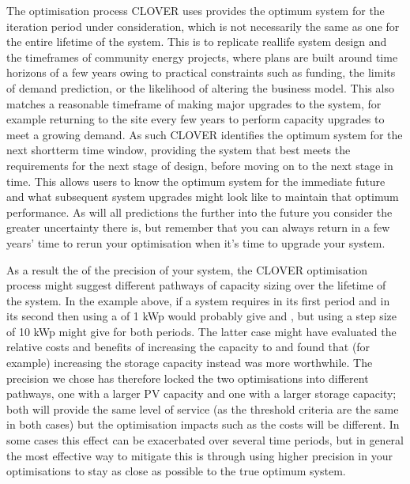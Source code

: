 \documentclass[letterpaper,10pt,english]{sphinxmanual}
\begin{document}
\sphinxAtStartPar
The optimisation process CLOVER uses provides the optimum system for the
iteration period under consideration, which is not necessarily the same
as one for the entire lifetime of the system. This is to replicate
real\sphinxhyphen{}life system design and the timeframes of community energy projects,
where plans are built around time horizons of a few years owing to
practical constraints such as funding, the limits of demand prediction,
or the likelihood of altering the business model. This also matches a
reasonable timeframe of making major upgrades to the system, for example
returning to the site every few years to perform capacity upgrades to
meet a growing demand. As such CLOVER identifies the optimum system for
the next short\sphinxhyphen{}term time window, providing the system that best meets
the requirements for the next stage of design, before moving on to the
next stage in time. This allows users to know the optimum system for the
immediate future and what subsequent system upgrades might look like to
maintain that optimum performance. As will all predictions the further
into the future you consider the greater uncertainty there is, but
remember that you can always return in a few years’ time to re\sphinxhyphen{}run your
optimisation when it’s time to upgrade your system.

\sphinxAtStartPar
As a result the of the precision of your system, the CLOVER optimisation
process might suggest different pathways of capacity sizing over the
lifetime of the system. In the example above, if a system requires
 in its first period and  in its
second then using a  of 1 kWp would probably give
 and , but using a step size of 10 kWp
might give  for both periods. The latter case might have
evaluated the relative costs and benefits of increasing the capacity to
 and found that (for example) increasing the storage
capacity instead was more worthwhile. The precision we chose has
therefore locked the two optimisations into different pathways, one with
a larger PV capacity and one with a larger storage capacity; both will
provide the same level of service (as the threshold criteria are the
same in both cases) but the optimisation impacts such as the costs will
be different. In some cases this effect can be exacerbated over several
time periods, but in general the most effective way to mitigate this is
through using higher precision in your optimisations to stay as close as
possible to the true optimum system.
\end{document}
